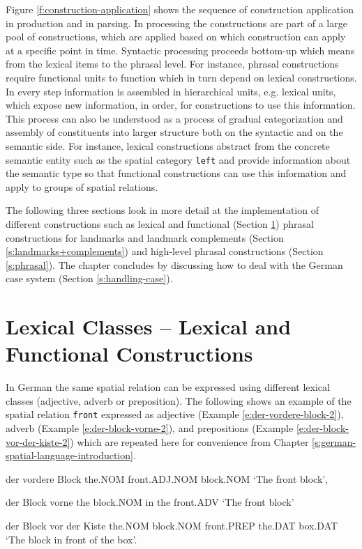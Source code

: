 Figure \ref{f:construction-application} shows the sequence of 
construction application in production and in parsing. 
In processing the constructions are part of a 
large pool of constructions, which are applied based on which 
construction can apply at a specific point in time.
Syntactic processing proceeds bottom-up which means from the lexical 
items to the phrasal level. For instance, phrasal constructions require functional 
units to function which in turn depend on lexical constructions. In every
step information is assembled in hierarchical units, e.g. lexical units,
which expose new information, in order, for constructions to use this information.
This process can also be understood as a process of gradual categorization
and assembly of constituents into larger structure both on 
the syntactic and on the semantic side. For instance, lexical constructions
abstract from the concrete semantic entity such as the spatial category 
{\footnotesize\tt left} and provide information about
the semantic type so that functional constructions can use this information
and apply to groups of spatial relations.

The following three sections look in more detail at the implementation
of different constructions such as lexical and functional 
(Section \ref{s:lexical-functional}) phrasal constructions for landmarks
and landmark complements (Section \ref{s:landmarks+complements})
and high-level phrasal constructions (Section \ref{s:phrasal}).
The chapter concludes by discussing how to deal with the German
case system (Section \ref{s:handling-case}).


\section{Lexical Classes -- Lexical and Functional Constructions}
\label{s:lexical-functional}
In German the same spatial relation can be expressed using different lexical classes
(adjective, adverb or preposition). The following shows 
an example of the spatial relation {\footnotesize\tt front} expressed
as adjective (Example \ref{e:der-vordere-block-2}), adverb (Example \ref{e:der-block-vorne-2}), 
and prepositions (Example \ref{e:der-block-vor-der-kiste-2}) which
are repeated here for convenience from Chapter \ref{s:german-spatial-language-introduction}.
\begin{example}
\label{e:der-vordere-block-2}
\gll der vordere Block 
the.NOM front.ADJ.NOM block.NOM 
\glt `The front block',
\glend
\end{example}
\begin{example}
\label{e:der-block-vorne-2}
\gll der Block vorne 
the block.NOM in the front.ADV 
\glt `The front block' 
\glend
\end{example}
\begin{example}
\label{e:der-block-vor-der-kiste-2}
\gll der Block vor der Kiste 
the.NOM block.NOM front.PREP the.DAT box.DAT 
\glt `The block in front of the box'.
\glend
\end{example}

